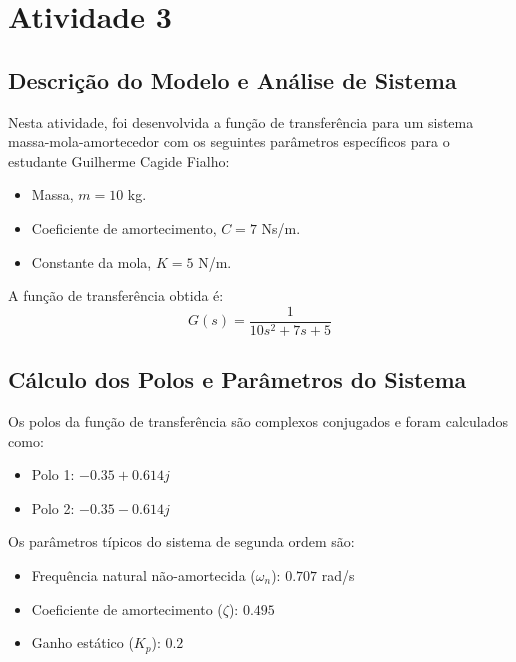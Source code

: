 \section{Atividade 3}

\subsection{Descrição do Modelo e Análise de Sistema}
Nesta atividade, foi desenvolvida a função de transferência para um sistema massa-mola-amortecedor com os seguintes parâmetros específicos para o estudante Guilherme Cagide Fialho:
\begin{itemize}
    \item Massa, \( m = 10 \) kg.
    \item Coeficiente de amortecimento, \( C = 7 \) Ns/m.
    \item Constante da mola, \( K = 5 \) N/m.
\end{itemize}
A função de transferência obtida é:
\[
G(s) = \frac{1}{10s^2 + 7s + 5}
\]

\subsection{Cálculo dos Polos e Parâmetros do Sistema}
Os polos da função de transferência são complexos conjugados e foram calculados como:
\begin{itemize}
    \item Polo 1: \( -0.35 + 0.614j \)
    \item Polo 2: \( -0.35 - 0.614j \)
\end{itemize}

Os parâmetros típicos do sistema de segunda ordem são:
\begin{itemize}
    \item Frequência natural não-amortecida (\( \omega_n \)): \( 0.707 \) rad/s
    \item Coeficiente de amortecimento (\( \zeta \)): \( 0.495 \)
    \item Ganho estático (\( K_p \)): \( 0.2 \)
\end{itemize}

